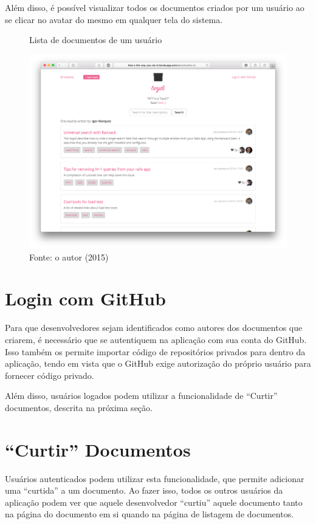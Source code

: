 Além disso, é possível visualizar todos os documentos criados por um usuário ao se clicar no avatar do mesmo em qualquer tela do sistema.

\begin{figure}[h]
	\centering
    \caption{Lista de documentos de um usuário}
    \includegraphics[width=15cm]{Imagens/print-by-user.png}
	\caption*{Fonte: o autor (2015)}
\end{figure}

\section{Login com GitHub}

Para que desenvolvedores sejam identificados como autores dos documentos que criarem, é necessário que se autentiquem na aplicação com sua conta do GitHub. Isso também os permite importar código de repositórios privados para dentro da aplicação, tendo em vista que o GitHub exige autorização do próprio usuário para fornecer código privado.

Além disso, usuários logados podem utilizar a funcionalidade de ``Curtir'' documentos, descrita na próxima seção.

\section{``Curtir'' Documentos}

Usuários autenticados podem utilizar esta funcionalidade, que permite adicionar uma ``curtida'' a um documento. Ao fazer isso, todos os outros usuários da aplicação podem ver que aquele desenvolvedor ``curtiu'' aquele documento tanto na página do documento em si quando na página de listagem de documentos.

